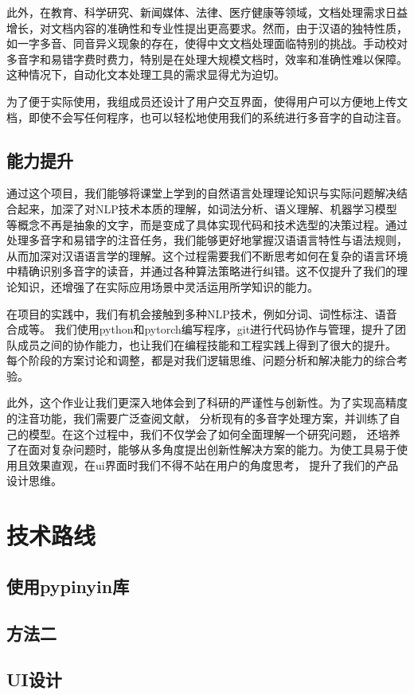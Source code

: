 \documentclass[12pt,hyperref,a4paper,UTF8]{ctexart}
\begin{document}
此外，在教育、科学研究、新闻媒体、法律、医疗健康等领域，文档处理需求日益增长，对文档内容的准确性和专业性提出更高要求。然而，由于汉语的独特性质，如一字多音、同音异义现象的存在，使得中文文档处理面临特别的挑战。手动校对多音字和易错字费时费力，特别是在处理大规模文档时，效率和准确性难以保障。这种情况下，自动化文本处理工具的需求显得尤为迫切。

为了便于实际使用，我组成员还设计了用户交互界面，使得用户可以方便地上传文档，即使不会写任何程序，也可以轻松地使用我们的系统进行多音字的自动注音。
\subsection{能力提升}
通过这个项目，我们能够将课堂上学到的自然语言处理理论知识与实际问题解决结合起来，加深了对NLP技术本质的理解，如词法分析、语义理解、机器学习模型等概念不再是抽象的文字，而是变成了具体实现代码和技术选型的决策过程。通过处理多音字和易错字的注音任务，我们能够更好地掌握汉语语言特性与语法规则，从而加深对汉语语言学的理解。这个过程需要我们不断思考如何在复杂的语言环境中精确识别多音字的读音，并通过各种算法策略进行纠错。这不仅提升了我们的理论知识，还增强了在实际应用场景中灵活运用所学知识的能力。

在项目的实践中，我们有机会接触到多种NLP技术，例如分词、词性标注、语音合成等。
我们使用python和pytorch编写程序，git进行代码协作与管理，提升了团队成员之间的协作能力，也让我们在编程技能和工程实践上得到了很大的提升。
每个阶段的方案讨论和调整，都是对我们逻辑思维、问题分析和解决能力的综合考验。

此外，这个作业让我们更深入地体会到了科研的严谨性与创新性。为了实现高精度的注音功能，我们需要广泛查阅文献，
分析现有的多音字处理方案，并训练了自己的模型。在这个过程中，我们不仅学会了如何全面理解一个研究问题，
还培养了在面对复杂问题时，能够从多角度提出创新性解决方案的能力。为使工具易于使用且效果直观，在ui界面时我们不得不站在用户的角度思考，
提升了我们的产品设计思维。
\section{技术路线}
\subsection{使用pypinyin库}
\subsection{方法二}
\subsection{UI设计}
\end{document}
